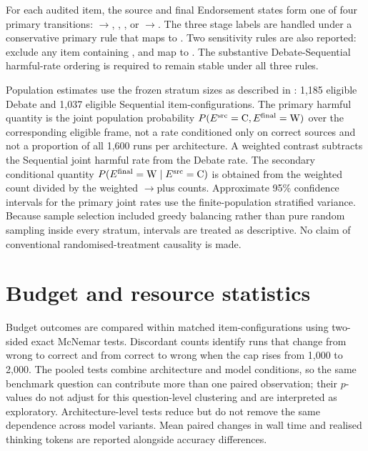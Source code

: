 For each audited item, the source and final Endorsement states form one of four primary transitions: \correct$\rightarrow$\correct, \ctow, \wtoc, or \wrong$\rightarrow$\wrong. The three \uncertain{} stage labels are handled under a conservative primary rule that maps \uncertain{} to \wrong{}. Two sensitivity rules are also reported: exclude any item containing \uncertain{}, and map \uncertain{} to \correct{}. The substantive Debate-Sequential harmful-rate ordering is required to remain stable under all three rules.

Population estimates use the frozen stratum sizes as described in : 1,185 eligible Debate and 1,037 eligible Sequential item-configurations. The primary harmful quantity is the joint population probability $P(E^{\mathrm{src}}=\mathrm{C},E^{\mathrm{final}}=\mathrm{W})$ over the corresponding eligible frame, not a rate conditioned only on correct sources and not a proportion of all 1,600 runs per architecture. A weighted contrast subtracts the Sequential joint harmful rate from the Debate rate. The secondary conditional quantity $P(E^{\mathrm{final}}=\mathrm{W}\mid E^{\mathrm{src}}=\mathrm{C})$ is obtained from the weighted \ctow{} count divided by the weighted \correct$\rightarrow$\correct plus \ctow{} counts. Approximate 95\% confidence intervals for the primary joint rates use the finite-population stratified variance. Because sample selection included greedy balancing rather than pure random sampling inside every stratum, intervals are treated as descriptive. No claim of conventional randomised-treatment causality is made.

\section{Budget and resource statistics}

Budget outcomes are compared within matched item-configurations using two-sided exact McNemar tests. Discordant counts identify runs that change from wrong to correct and from correct to wrong when the cap rises from 1,000 to 2,000. The pooled tests combine architecture and model conditions, so the same benchmark question can contribute more than one paired observation; their $p$-values do not adjust for this question-level clustering and are interpreted as exploratory. Architecture-level tests reduce but do not remove the same dependence across model variants. Mean paired changes in wall time and realised thinking tokens are reported alongside accuracy differences.

